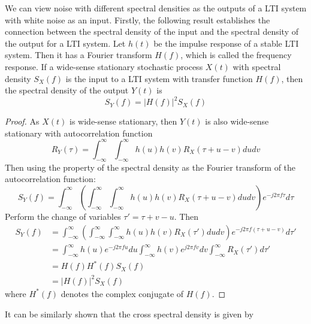 \documentclass[11pt]{report} %
\begin{document}
We can view noise with different spectral densities as the outputs of a LTI system with white noise as an input. Firstly, the following result establishes the connection between the spectral density of the input and the spectral density of the output for a LTI system. Let $h\left(t\right)$ be the impulse response of a stable LTI system. Then it has a Fourier transform $H\left(f\right)$, which is called the frequency response. If a wide-sense stationary stochastic process $X\left(t\right)$ with spectral density $S_{X}\left(f\right)$ is the input to a LTI system with transfer function $H\left(f\right)$, then the spectral density of the output $Y\left(t\right)$ is
\begin{equation}
S_{Y}\left(f\right) = \left|H\left(f\right)\right|^{2}S_{X}\left(f\right)
\end{equation}
\begin{proof}
As $X\left(t\right)$ is wide-sense stationary, then $Y\left(t\right)$ is also wide-sense stationary with autocorrelation function
\begin{equation}
R_{Y}\left(\tau\right) = \int_{-\infty}^{\infty}\int_{-\infty}^{\infty}h\left(u\right)h\left(v\right)R_{X}\left(\tau+u-v\right)dudv
\end{equation}
Then using the property of the spectral density as the Fourier transform of the autocorrelation function:
\begin{equation}
S_{Y}\left(f\right) = \int_{-\infty}^{\infty}\left(\int_{-\infty}^{\infty}\int_{-\infty}^{\infty}h\left(u\right)h\left(v\right)R_{X}\left(\tau+u-v\right)dudv\right)e^{-j2\pi f\tau}d\tau
\end{equation}
Perform the change of variables $\tau' = \tau + v - u$. Then
\begin{align}
S_{Y}\left(f\right) &= \int_{-\infty}^{\infty}\left(\int_{-\infty}^{\infty}\int_{-\infty}^{\infty}h\left(u\right)h\left(v\right)R_{X}\left(\tau'\right)dudv\right)e^{-j2\pi f\left(\tau + u - v\right)}d\tau' \\
&= \int_{-\infty}^{\infty}h\left(u\right)e^{-j2\pi fu}du\int_{-\infty}^{\infty}h\left(v\right)e^{j2\pi fv}dv\int_{-\infty}^{\infty}R_{X}\left(\tau'\right)d\tau' \\
&= H\left(f\right)H^{*}\left(f\right)S_{X}\left(f\right) \\
&= \left|H\left(f\right)\right|^{2}S_{X}\left(f\right)
\end{align}
where $H^{*}\left(f\right)$ denotes the complex conjugate of $H\left(f\right)$.
\end{proof}
It can be similarly shown that the cross spectral density is given by
\end{document}
